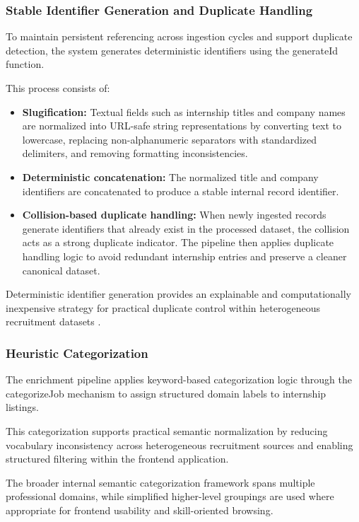 \subsubsection*{Stable Identifier Generation and Duplicate Handling}

To maintain persistent referencing across ingestion cycles and support duplicate detection, the system generates deterministic identifiers using the generateId function.

This process consists of:
\begin{itemize}[leftmargin=1.4em,itemsep=0.25em,topsep=0.25em]
\item \textbf{Slugification:} Textual fields such as internship titles and company names are normalized into URL-safe string representations by converting text to lowercase, replacing non-alphanumeric separators with standardized delimiters, and removing formatting inconsistencies.
\item \textbf{Deterministic concatenation:} The normalized title and company identifiers are concatenated to produce a stable internal record identifier.
\item \textbf{Collision-based duplicate handling:} When newly ingested records generate identifiers that already exist in the processed dataset, the collision acts as a strong duplicate indicator. The pipeline then applies duplicate handling logic to avoid redundant internship entries and preserve a cleaner canonical dataset.
\end{itemize}
Deterministic identifier generation provides an explainable and computationally inexpensive strategy for practical duplicate control within heterogeneous recruitment datasets \cite{christen2012data, chu2016data, li2020survey}.

\subsubsection*{Heuristic Categorization}

The enrichment pipeline applies keyword-based categorization logic through the categorizeJob mechanism to assign structured domain labels to internship listings.

This categorization supports practical semantic normalization by reducing vocabulary inconsistency across heterogeneous recruitment sources and enabling structured filtering within the frontend application.

The broader internal semantic categorization framework spans multiple professional domains, while simplified higher-level groupings are used where appropriate for frontend usability and skill-oriented browsing.

